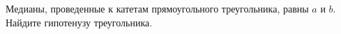 \begin{ex}
	\begin{condition}
		Медианы, проведенные к катетам прямоугольного треугольника, равны \( a  \) и \( b \). Найдите гипотенузу треугольника.
	\end{condition}
\end{ex}